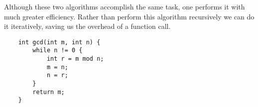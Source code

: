\documentclass[12pt]{report}
\begin{document}
\begin{flushleft}
Although these two algorithms accomplish the same task, one performs it
with much greater efficiency. Rather than perform this algorithm recursively
we can do it iteratively, saving us the overhead of a function call.

\begin{lstlisting}
    int gcd(int m, int n) {
        while n != 0 {
            int r = m mod n;
            m = n;
            n = r;
        }
        return m;
    }
\end{lstlisting}

\end{flushleft}
\end{document}
